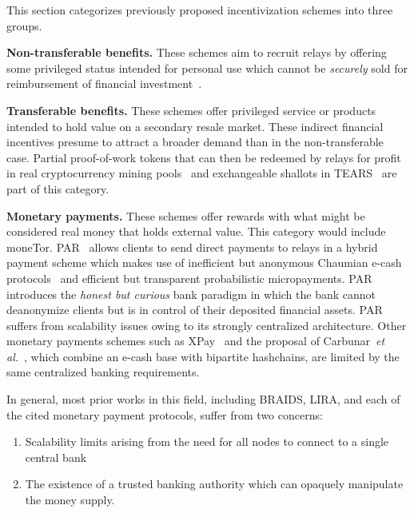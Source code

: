 This section categorizes previously proposed incentivization schemes into three groups.

\medskip\noindent\textbf{Non-transferable benefits.} These schemes aim to recruit relays by offering some privileged status intended for personal use which cannot be \emph{securely} sold for reimbursement of financial investment~\cite{dingledine2010building,jansen2010recruiting, jansen2013lira}.

\medskip\noindent\textbf{Transferable benefits.} These schemes offer privileged service or products intended to hold value on a secondary resale market.
These indirect financial incentives presume to attract a broader demand than in the non-transferable case.
Partial proof-of-work tokens that can then be redeemed by relays for profit in real cryptocurrency mining pools~\cite{biryukov2015proof} and exchangeable shallots in TEARS~\cite{jansen2014onions} are part of this category.

\medskip\noindent\textbf{Monetary payments.} These schemes offer rewards with what might be considered real money that holds external value.
This category would include moneTor.
PAR~\cite{androulaki2008payment} allows clients to send direct payments to relays in a hybrid payment scheme which makes use of inefficient but anonymous Chaumian e-cash protocols~\cite{chaum1988untraceable} and efficient but transparent probabilistic micropayments.
PAR introduces the \emph{honest but curious} bank paradigm in which the bank cannot deanonymize clients but is in control of their deposited financial assets.
PAR suffers from scalability issues owing to its strongly centralized architecture.
Other monetary payments schemes such as XPay~\cite{chen2009xpay} and the proposal of Carbunar~\textit{et al.}~\cite{carbunar2012tipping}, which combine an e-cash base with bipartite hashchains, are limited by the same centralized banking requirements.

In general, most prior works in this field, including BRAIDS, LIRA, and each of the cited monetary payment protocols, suffer from two concerns:

\begin{enumerate}
\item Scalability limits arising from the need for all nodes to connect to a single central bank
\item The existence of a trusted banking authority which can opaquely manipulate the money supply.
\end{enumerate}

